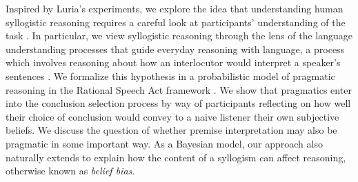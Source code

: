 \documentclass[floatsintext, doc]{apa6}
\begin{document}
Inspired by Luria's experiments, we explore the idea that understanding human syllogistic reasoning requires a careful look at participants' understanding of the task \cite{henle1962relation}. 
In particular, we view syllogistic reasoning through the lens of the language understanding processes that guide everyday reasoning with language, a process which involves reasoning about how an interlocutor would interpret a speaker's sentences \cite{Grice1975, Clark1996, Levinson2000}. 
We formalize this hypothesis in a probabilistic model of pragmatic reasoning in the Rational Speech Act framework \cite{Frank2012a, goodman2016pragmatic}.
We show that pragmatics enter into the conclusion selection process by way of participants reflecting on how well their choice of conclusion would convey to a naive listener their own subjective beliefs. 
We discuss the question of whether premise interpretation may also be pragmatic in some important way.
As a Bayesian model, our approach also naturally extends to explain how the content of a syllogism can affect reasoning, otherwise known as \emph{belief bias}. 










%
%
\end{document}
